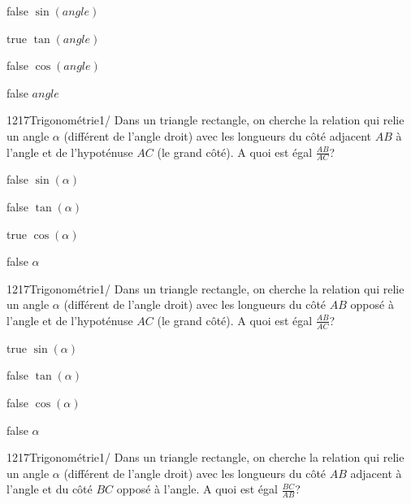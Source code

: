 \documentclass[11pt]{article}
\begin{document}
            \begin{reponses}
            	\item[false] $\sin(angle)$
                \item[true] $\tan(angle)$
                \item[false] $\cos(angle)$
            	\item[false] $angle$
            \end{reponses}
        
        	\begin{question}{1217}{Trigonométrie}{1}{/}
				Dans un triangle rectangle, on cherche la relation qui relie un angle $\alpha$ (différent de l'angle droit) avec les longueurs du côté adjacent $AB$ à l'angle et de l'hypoténuse $AC$ (le grand côté). A quoi est égal $\frac{AB}{AC}$?
            \end{question}

            \begin{reponses}
            	\item[false] $\sin(\alpha)$
            	\item[false] $\tan(\alpha)$
                \item[true] $\cos(\alpha)$
                \item[false] $\alpha$
            \end{reponses}
        
        	\begin{question}{1217}{Trigonométrie}{1}{/}
				Dans un triangle rectangle, on cherche la relation qui relie un angle $\alpha$ (différent de l'angle droit) avec les longueurs du côté $AB$ opposé à l'angle et de l'hypoténuse $AC$ (le grand côté). A quoi est égal $\frac{AB}{AC}$?
            \end{question}

            \begin{reponses}
            	\item[true] $\sin(\alpha)$
            	\item[false] $\tan(\alpha)$
                \item[false] $\cos(\alpha)$
                \item[false] $\alpha$
            \end{reponses}
        
        	\begin{question}{1217}{Trigonométrie}{1}{/}
				Dans un triangle rectangle, on cherche la relation qui relie un angle $\alpha$ (différent de l'angle droit) avec les longueurs du côté $AB$ adjacent à l'angle et du côté $BC$ opposé à l'angle. A quoi est égal $\frac{BC}{AB}$?
            \end{question}
\end{document}
